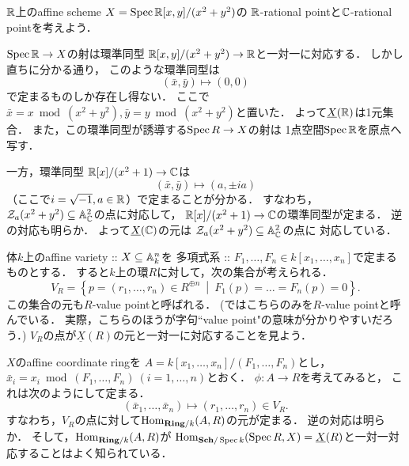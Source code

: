 \documentclass[a4paper]{jsarticle}
\newcommand{\Sch}{\mathbf{Sch}}
\newcommand{\Ring}{\mathbf{Ring}}
\newcommand{\ftor}[1]{\underline{#1}}
\begin{document}
    \begin{Example}
        $\mathbb{R}$上のaffine scheme $X=\operatorname{Spec} \mathbb{R}[x,y]/(x^2+y^2)$の
        $\mathbb{R}$-rational pointと$\mathbb{C}$-rational pointを考えよう．

        $\operatorname{Spec} \mathbb{R} \to X$の射は環準同型 $\mathbb{R}[x,y]/(x^2+y^2) \to \mathbb{R}$と一対一に対応する．
        しかし直ちに分かる通り，
        このような環準同型は
        \[ (\bar{x}, \bar{y}) \mapsto (0, 0) \]
        で定まるものしか存在し得ない．
        ここで$\bar{x}=x \bmod (x^2+y^2), \bar{y}=y \bmod (x^2+y^2)$と置いた．
        よって$\ftor{X}(\R)$は1元集合．
        また，この環準同型が誘導する$\operatorname{Spec} R \to X$の射は
        1点空間$\operatorname{Spec} \mathbb{R}$を原点へ写す．

        一方，環準同型 $\mathbb{R}[x]/(x^2+1) \to \mathbb{C}$は
        \[ (\bar{x}, \bar{y}) \mapsto (a, \pm ia) \]
        （ここで$i=\sqrt{-1}, a \in \mathbb{R}$）で定まることが分かる．
        すなわち，$\mathcal{Z}_a(x^2+y^2) \subseteq \mathbb{A}^2_{\mathbb{C}}$の点に対応して，
        $\mathbb{R}[x]/(x^2+1) \to \mathbb{C}$の環準同型が定まる．
        逆の対応も明らか．
        よって$\ftor{X}(\C)$の元は
        $\mathcal{Z}_a(x^2+y^2) \subseteq \mathbb{A}^2_{\mathbb{C}}$の点に
        対応している．
    \end{Example}

    \begin{Example}
        体$k$上のaffine variety :: 
        $X \subseteq \mathbb{A}^n_k$を
        多項式系 :: $F_1,\dots,F_n \in k[x_1,\dots,x_n]$で定まるものとする．
        すると$k$上の環$R$に対して，次の集合が考えられる．
        \[ V_R=\left\{ p=(r_1,\dots,r_n) \in R^{\oplus n} ~\middle|~ F_1(p)=\dots=F_n(p)=0 \right\}. \]
        この集合の元も$R$-value pointと呼ばれる．
        (\cite{Muk1}ではこちらのみを$R$-value pointと呼んでいる．
        実際，こちらのほうが字句``value point"の意味が分かりやすいだろう．)
        $V_R$の点が$\ftor{X}(R)$の元と一対一に対応することを見よう．

        $X$のaffine coordinate ringを
        $A=k[x_1,\dots,x_n]/(F_1,\dots,F_n)$とし，
        $\bar{x}_i=x_i \bmod (F_1,\dots,F_n) ~(i=1,\dots,n)$とおく．
        $\phi: A \to R$を考えてみると，
        これは次のようにして定まる．
        \[ (\bar{x}_1,\dots,\bar{x}_n) \mapsto (r_1,\dots,r_n) \in V_R. \]
        すなわち，$V_R$の点に対して$\Hom_{\Ring/k}(A,R)$の元が定まる．
        逆の対応は明らか．
        そして，$\Hom_{\Ring/k}(A,R)$が
        $\Hom_{\Sch/\Spec k}(\Spec R, X)=\ftor{X}(R)$と一対一対応することはよく知られている．
    \end{Example}
\end{document}
